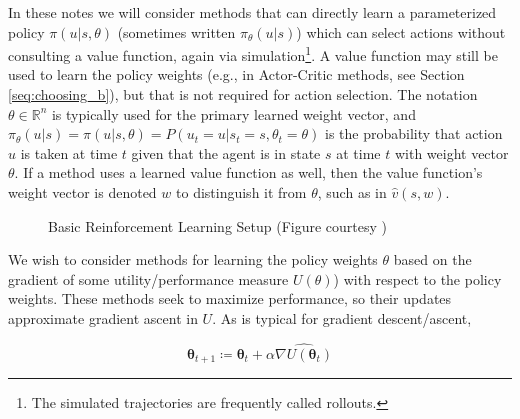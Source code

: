 \documentclass[11pt, oneside]{article}					%
\begin{document}
\bigskip
\noindent
In these notes we will consider methods that can directly learn a
parameterized policy $\pi(u | s, \theta)$ (sometimes written
$\pi_{\theta}(u | s)$) which can select actions without
consulting a value function, again via simulation\footnote{The
simulated trajectories are frequently called rollouts.}.  A value
function may still be used to learn the policy weights (e.g., in
Actor-Critic methods, see Section \ref{seq:choosing_b}), but that
is not required for action selection. The notation $\theta \in
\mathbb{R}^n$ is typically used for the primary learned weight
vector, and $\pi_{\theta}(u | s) = \pi(u | s, \theta) = P(u_t = u
| s_t = s, \theta_t = \theta)$ is the probability that action $u$
is taken at time $t$ given that the agent is in state $s$ at time
$t$ with weight vector $\theta$. If a method uses a learned value
function as well, then the value function's weight vector is
denoted $w$ to distinguish it from $\theta$, such as in
$\hat{v}(s,w)$.

\begin{figure}
\caption{Basic Reinforcement Learning Setup (Figure courtesy 
         \cite{SuttonBook})}
\label{fig:rl}
\end{figure}


\bigskip
\noindent
We wish to consider methods for learning the policy weights
$\theta$ based on the gradient of some utility/performance
measure $U(\theta)$) with respect to the policy weights. These
methods seek to maximize performance, so their updates
approximate gradient ascent in $U$. As is typical for gradient
descent/ascent,

\begin{equation}
\boldsymbol{\theta}_{t+1} \coloneqq \boldsymbol{\theta}_t +
\alpha \widehat{\nabla U(\boldsymbol{\theta}_t)} 
\label{eqn:gd}
\end{equation}
\end{document}
